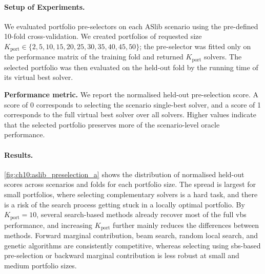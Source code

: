 \paragraph{Setup of Experiments.}
We evaluated portfolio pre-selectors on each ASlib scenario using the pre-defined 10-fold cross-validation. We created portfolios of requested size $K_{\mathrm{port}}\in\{2,5,10,15,20,25,30,35,40,45,50\}$; the pre-selector was fitted only on the performance matrix of the training fold and returned $K_{\mathrm{port}}$ solvers. The selected portfolio was then evaluated on the held-out fold by the running time of its virtual best solver.

\textbf{Performance metric.} We report the normalised held-out pre-selection score. A score of 0 corresponds to selecting the scenario single-best solver, and a score of 1 corresponds to the full virtual best solver over all solvers. Higher values indicate that the selected portfolio preserves more of the scenario-level oracle performance.

\paragraph{Results.}
\cref{fig:ch10:aslib_preselection_a} shows the distribution of normalised held-out scores across scenarios and folds for each portfolio size. The spread is largest for small portfolios, where selecting complementary solvers is a hard task, and there is a risk of the search process getting stuck in a locally optimal portfolio. By $K_{\mathrm{port}}=10$, several search-based methods already recover most of the full \gls{vbs} performance, and increasing $K_{\mathrm{port}}$ further mainly reduces the differences between methods. Forward marginal contribution, beam search, random local search, and genetic algorithms are consistently competitive, whereas selecting using \gls{sbs}-based pre-selection or backward marginal contribution is less robust at small and medium portfolio sizes.

